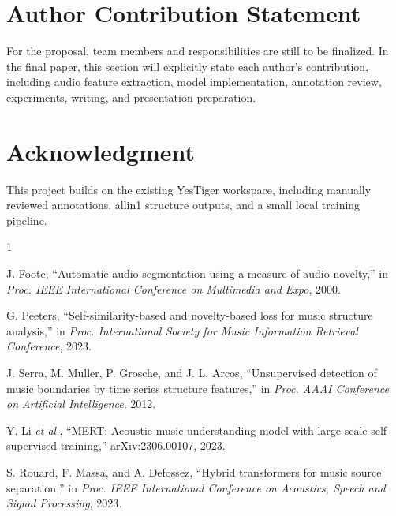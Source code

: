 \documentclass[lettersize,journal]{IEEEtran}
\begin{document}
\section{Author Contribution Statement}
For the proposal, team members and responsibilities are still to be finalized. In the final paper, this section will explicitly state each author's contribution, including audio feature extraction, model implementation, annotation review, experiments, writing, and presentation preparation.

\section*{Acknowledgment}
This project builds on the existing YesTiger workspace, including manually reviewed annotations, allin1 structure outputs, and a small local training pipeline.

\begin{thebibliography}{1}

J. Foote, ``Automatic audio segmentation using a measure of audio novelty,'' in \emph{Proc. IEEE International Conference on Multimedia and Expo}, 2000.

G. Peeters, ``Self-similarity-based and novelty-based loss for music structure analysis,'' in \emph{Proc. International Society for Music Information Retrieval Conference}, 2023.

J. Serra, M. Muller, P. Grosche, and J. L. Arcos, ``Unsupervised detection of music boundaries by time series structure features,'' in \emph{Proc. AAAI Conference on Artificial Intelligence}, 2012.

Y. Li \emph{et al.}, ``MERT: Acoustic music understanding model with large-scale self-supervised training,'' arXiv:2306.00107, 2023.

S. Rouard, F. Massa, and A. Defossez, ``Hybrid transformers for music source separation,'' in \emph{Proc. IEEE International Conference on Acoustics, Speech and Signal Processing}, 2023.

\end{thebibliography}
\end{document}
